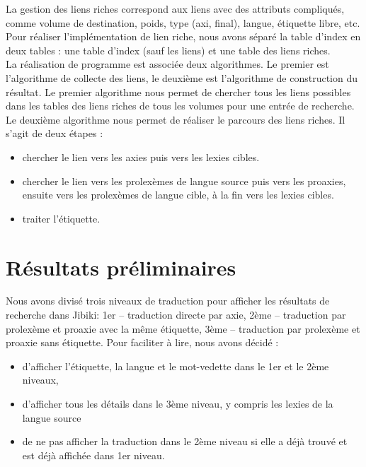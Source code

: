 \documentclass[10pt,a4paper,twoside]{article}
\begin{document}
\begin{itemize}
La gestion des liens riches correspond aux liens avec des attributs compliqués, comme volume de destination, poids, type (axi, final), langue, étiquette libre, etc. Pour réaliser l’implémentation de lien riche,  nous avons séparé la table d’index en deux tables : une table d’index (sauf les liens) et une table des liens riches. \\ 
La réalisation de programme est associée deux algorithmes. Le premier est l’algorithme de collecte des liens, le deuxième est l’algorithme de construction du résultat.  Le premier algorithme nous permet de chercher tous les liens possibles dans les tables des liens riches de tous les volumes pour une entrée de recherche. Le deuxième algorithme nous permet de réaliser le parcours des liens riches. Il s’agit de deux étapes :
\begin{itemize}
\begin{itemize}
\item chercher le lien vers les axies puis vers les lexies cibles.
\item chercher le lien vers les prolexèmes de langue source puis vers les proaxies, ensuite vers les prolexèmes de langue cible, à la fin vers les lexies cibles.
\item traiter l'étiquette.
\end{itemize}
\end{itemize}


\section{Résultats préliminaires}

Nous avons divisé trois niveaux de traduction pour afficher les résultats de recherche dans Jibiki: 1er – traduction directe par axie, 2ème – traduction par prolexème et proaxie avec la même étiquette, 3ème – traduction par prolexème et proaxie sans étiquette.  Pour faciliter à lire, nous avons décidé : 
\begin{itemize}
\begin{itemize}
\item d’afficher l’étiquette, la langue et le mot-vedette dans le 1er et le 2ème niveaux, 
\item d’afficher tous les détails dans le 3ème niveau, y compris les lexies de la langue source
\item de ne pas afficher la traduction dans le 2ème niveau si elle a déjà trouvé et est déjà affichée dans 1er niveau.
\end{itemize}
\end{itemize}


\end{itemize}
\end{document}
